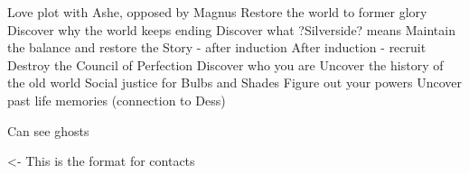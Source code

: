 \documentclass[char]{Silversiders}
\begin{document}
\name{\cWisdom{}}

Love plot with Ashe, opposed by Magnus
Restore the world to former glory
Discover why the world keeps ending
Discover what ?Silverside? means
Maintain the balance and restore the Story - after induction
After induction - recruit
Destroy the Council of Perfection
Discover who you are
Uncover the history of the old world
Social justice for Bulbs and Shades
Figure out your powers
Uncover past life memories (connection to Dess)

Can see ghosts

\begin{itemz}[Goals]
	\item 
\end{itemz}

\begin{itemz}[Notes]
	\item 
\end{itemz}

\begin{contacts}
	\contact{\cTest{}} <- This is the format for contacts 
\end{contacts}
\end{document}
